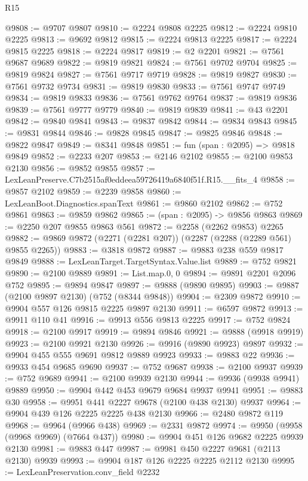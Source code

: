 \begin{lexlean}{R15}
\begin{coremodule}
@9808 := @9707 @9807
@9810 := @2224 @9808 @2225
@9812 := @2224 @9810 @2225
@9813 := @9692 @9812
@9815 := @2224 @9813 @2225
@9817 := @2224 @9815 @2225
@9818 := @2224 @9817
@9819 := @2 @2201
@9821 := @7561 @9687 @9689
@9822 := @9819 @9821
@9824 := @7561 @9702 @9704
@9825 := @9819 @9824
@9827 := @7561 @9717 @9719
@9828 := @9819 @9827
@9830 := @7561 @9732 @9734
@9831 := @9819 @9830
@9833 := @7561 @9747 @9749
@9834 := @9819 @9833
@9836 := @7561 @9762 @9764
@9837 := @9819 @9836
@9839 := @7561 @9777 @9779
@9840 := @9819 @9839
@9841 := @43 @2201
@9842 := @9840 @9841
@9843 := @9837 @9842
@9844 := @9834 @9843
@9845 := @9831 @9844
@9846 := @9828 @9845
@9847 := @9825 @9846
@9848 := @9822 @9847
@9849 := @8341 @9848
@9851 := fun (span : @2095) => @9818 @9849
@9852 := @2233 @207
@9853 := @2146 @2102
@9855 := @2100 @9853 @2130
@9856 := @9852 @9855
@9857 := LexLeanPreserve.C7b2515af0eddeea59726419a6840f51f.R15.__fits_4
@9858 := @9857 @2102
@9859 := @2239 @9858
@9860 := LexLeanBoot.Diagnostics.spanText
@9861 := @9860 @2102
@9862 := @752 @9861
@9863 := @9859 @9862
@9865 := (span : @2095) -> @9856 @9863
@9869 := @2250 @207 @9855 @9863 @561
@9872 := @2258 (@2262 @9853) @2265
@9882 := @9869 @9872 (@2271 (@2281 @207)) (@2287 (@2288 (@2289 @561) @9855 @2265))
@9883 := @3818 @9872
@9887 := @9883 @238 @559 @9817 @9849
@9888 := LexLeanTarget.TargetSyntax.Value.list
@9889 := @752 @9821
@9890 := @2100 @9889
@9891 := List.map.{0, 0}
@9894 := @9891 @2201 @2096 @752
@9895 := @9894 @9847
@9897 := @9888 (@9890 @9895)
@9903 := @9887 (@2100 @9897 @2130) (@752 (@8344 @9848))
@9904 := @2309 @9872
@9910 := @9904 @557 @126 @9815 @2225 @9897 @2130
@9911 := @6597 @9872
@9913 := @9911 @110 @41
@9916 := @9913 @556 @9813 @2225
@9917 := @752 @9824
@9918 := @2100 @9917
@9919 := @9894 @9846
@9921 := @9888 (@9918 @9919)
@9923 := @2100 @9921 @2130
@9926 := @9916 (@9890 @9923) @9897
@9932 := @9904 @455 @555 @9691 @9812 @9889 @9923
@9933 := @9883 @22
@9936 := @9933 @454 @9685 @9690
@9937 := @752 @9687
@9938 := @2100 @9937
@9939 := @752 @9689
@9941 := @2100 @9939 @2130
@9944 := @9936 (@9938 @9941) @9889
@9950 := @9904 @442 @453 @9679 @9684 @9937 @9941
@9951 := @9883 @30
@9958 := @9951 @441 @2227 @9678 (@2100 @438 @2130) @9937
@9964 := @9904 @439 @126 @2225 @2225 @438 @2130
@9966 := @2480 @9872 @119
@9968 := @9964 (@9966 @438)
@9969 := @2331 @9872
@9974 := @9950 (@9958 (@9968 @9969) (@7664 @437))
@9980 := @9904 @451 @126 @9682 @2225 @9939 @2130
@9981 := @9883 @447
@9987 := @9981 @450 @2227 @9681 (@2113 @2130) @9939
@9993 := @9904 @187 @126 @2225 @2225 @2112 @2130
@9995 := LexLeanPreservation.conv_field @2232

\end{coremodule}
\end{lexlean}
